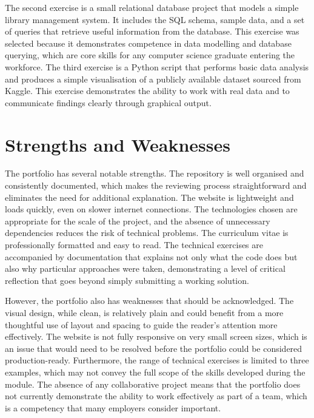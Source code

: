 \documentclass[12pt,a4paper]{article}
\begin{document}
The second exercise is a small relational database project that models a simple library management system. It includes the SQL schema, sample data, and a set of queries that retrieve useful information from the database. This exercise was selected because it demonstrates competence in data modelling and database querying, which are core skills for any computer science graduate entering the workforce. The third exercise is a Python script that performs basic data analysis and produces a simple visualisation of a publicly available dataset sourced from Kaggle. This exercise demonstrates the ability to work with real data and to communicate findings clearly through graphical output.

\section{Strengths and Weaknesses}

The portfolio has several notable strengths. The repository is well organised and consistently documented, which makes the reviewing process straightforward and eliminates the need for additional explanation. The website is lightweight and loads quickly, even on slower internet connections. The technologies chosen are appropriate for the scale of the project, and the absence of unnecessary dependencies reduces the risk of technical problems. The curriculum vitae is professionally formatted and easy to read. The technical exercises are accompanied by documentation that explains not only what the code does but also why particular approaches were taken, demonstrating a level of critical reflection that goes beyond simply submitting a working solution.

However, the portfolio also has weaknesses that should be acknowledged. The visual design, while clean, is relatively plain and could benefit from a more thoughtful use of layout and spacing to guide the reader's attention more effectively. The website is not fully responsive on very small screen sizes, which is an issue that would need to be resolved before the portfolio could be considered production-ready. Furthermore, the range of technical exercises is limited to three examples, which may not convey the full scope of the skills developed during the module. The absence of any collaborative project means that the portfolio does not currently demonstrate the ability to work effectively as part of a team, which is a competency that many employers consider important.
\end{document}
